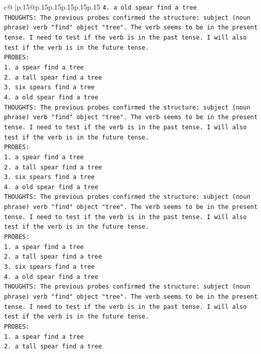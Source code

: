\documentclass{article}
\begin{document}
{\begin{supertabular}{c@{$\;$}|p{.15\linewidth}@{}p{.15\linewidth}p{.15\linewidth}p{.15\linewidth}p{.15\linewidth}p{.15\linewidth}}
{{{\texttt{4. a old spear find a tree} \\
\texttt{THOUGHTS: The previous probes confirmed the structure: subject (noun phrase) verb "find" object "tree". The verb seems to be in the present tense. I need to test if the verb is in the past tense. I will also test if the verb is in the future tense.} \\
\texttt{PROBES:} \\
\texttt{1. a spear find a tree} \\
\texttt{2. a tall spear find a tree} \\
\texttt{3. six spears find a tree} \\
\texttt{4. a old spear find a tree} \\
\texttt{THOUGHTS: The previous probes confirmed the structure: subject (noun phrase) verb "find" object "tree". The verb seems to be in the present tense. I need to test if the verb is in the past tense. I will also test if the verb is in the future tense.} \\
\texttt{PROBES:} \\
\texttt{1. a spear find a tree} \\
\texttt{2. a tall spear find a tree} \\
\texttt{3. six spears find a tree} \\
\texttt{4. a old spear find a tree} \\
\texttt{THOUGHTS: The previous probes confirmed the structure: subject (noun phrase) verb "find" object "tree". The verb seems to be in the present tense. I need to test if the verb is in the past tense. I will also test if the verb is in the future tense.} \\
\texttt{PROBES:} \\
\texttt{1. a spear find a tree} \\
\texttt{2. a tall spear find a tree} \\
\texttt{3. six spears find a tree} \\
\texttt{4. a old spear find a tree} \\
\texttt{THOUGHTS: The previous probes confirmed the structure: subject (noun phrase) verb "find" object "tree". The verb seems to be in the present tense. I need to test if the verb is in the past tense. I will also test if the verb is in the future tense.} \\
\texttt{PROBES:} \\
\texttt{1. a spear find a tree} \\
\texttt{2. a tall spear find a tree} \\
}}}
\end{supertabular}}
\end{document}
